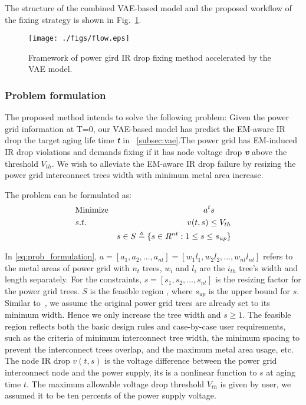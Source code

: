 The structure of the combined VAE-based model and the proposed workflow of the fixing strategy is shown in Fig.~\ref{fig:flow}. 


\begin{figure}[h!]
	\centering
	\texttt{[image: ./figs/flow.eps]}
	\caption{Framework of power gird IR drop fixing method accelerated by the VAE model.}
	\label{fig:flow}
\end{figure}

\subsubsection{Problem formulation}
\label{subsubsec:formulation}
The proposed method intends to solve the following problem: 
Given the power grid information at T=0, our VAE-based model has predict the EM-aware IR drop the target aging life time \textit{\textbf{t}} in ~\ref{subsec:vae}.The power grid has EM-induced IR drop violations and demands fixing if it has node voltage drop \textit{\textbf{v}}  above the threshold $V_{th}$.
We wish to alleviate the EM-aware IR drop failure by resizing the power grid interconnect trees width with minimum metal area increase.

The problem can be formulated as:
\begin{align}
	\label{eq:prob_formulation}
	&\mbox{Minimize}  & a^{t}s \qquad   \notag  \\
	&s.t.     & v(t,s)\leq V_{th} \\
	& \quad   &s \in S   \triangleq \{ s \in R^{nt}: 1 \leq s \leq s_{up} \}        \notag
\end{align}

In \eqref{eq:prob_formulation}, $a=[a_{1},a_{2},\ldots,a_{nt}] = [w_{1}l_{1},w_{2}l_{2},\ldots,w_{nt}l_{nt}]$ refers to the metal areas of power grid with $n_{t}$ trees, $w_{i}$ and $l_{i}$ are the $i_{th}$ tree's width and length separately.
For the constraints, $s=[s_{1},s_{2},\ldots,s_{nt}]$  is the resizing factor for the power grid trees. $S$ is the feasible region ,
where $s_{up}$ is the upper bound for $s$. Similar to~\cite{Sukharev:2019pg}, we assume the original power grid trees are already set to its minimum width. Hence we only increase the tree width and $s \geq 1 $.
The feasible region reflects both the basic design rules and case-by-case user requirements, such as the criteria of minimum interconnect tree width, the minimum spacing to prevent the  interconnect trees overlap, and the maximum metal area usage, etc. 
The node IR drop $v(t,s)$  is the voltage difference between the power grid interconnect node and the power supply, its is a nonlinear function to $s$ at aging time $t$. The maximum allowable voltage drop threshold $V_{th}$ is given by user, we assumed it to be ten percents of the power supply voltage.


